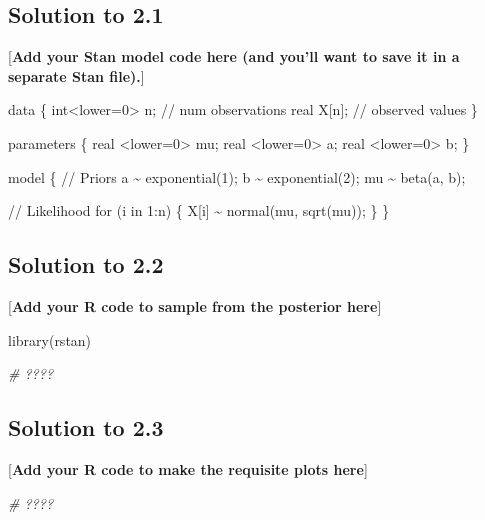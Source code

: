 \documentclass[
]{article}
\newenvironment{Shaded}{\begin{snugshade}}{\end{snugshade}}
\newcommand{\CommentTok}[1]{\textcolor[rgb]{0.56,0.35,0.01}{\textit{#1}}}
\newcommand{\FunctionTok}[1]{\textcolor[rgb]{0.00,0.00,0.00}{#1}}
\newcommand{\NormalTok}[1]{#1}
\begin{document}
\hypertarget{solution-to-2.1}{%
\subsection{Solution to 2.1}\label{solution-to-2.1}}

{[}\textbf{Add your Stan model code here (and you'll want to save it in
a separate Stan file).}{]}

\begin{Shaded}
\begin{Highlighting}[]
\NormalTok{data \{}
\NormalTok{  int\textless{}lower=0\textgreater{} n; // num observations}
\NormalTok{  real X[n];     // observed values}
\NormalTok{\}}

\NormalTok{parameters \{}
\NormalTok{  real \textless{}lower=0\textgreater{} mu;}
\NormalTok{  real \textless{}lower=0\textgreater{} a;}
\NormalTok{  real \textless{}lower=0\textgreater{} b;}
\NormalTok{\}}

\NormalTok{model \{}
\NormalTok{  // Priors}
\NormalTok{  a \textasciitilde{} exponential(1);}
\NormalTok{  b \textasciitilde{} exponential(2);}
\NormalTok{  mu \textasciitilde{} beta(a, b);}
  
\NormalTok{  // Likelihood}
\NormalTok{  for (i in 1:n) \{}
\NormalTok{    X[i] \textasciitilde{} normal(mu, sqrt(mu));}
\NormalTok{  \}}
\NormalTok{\}}
\end{Highlighting}
\end{Shaded}

\hypertarget{solution-to-2.2}{%
\subsection{Solution to 2.2}\label{solution-to-2.2}}

{[}\textbf{Add your R code to sample from the posterior here}{]}

\begin{Shaded}
\begin{Highlighting}[]
\FunctionTok{library}\NormalTok{(rstan)}

\CommentTok{\# ????}
\end{Highlighting}
\end{Shaded}

\hypertarget{solution-to-2.3}{%
\subsection{Solution to 2.3}\label{solution-to-2.3}}

{[}\textbf{Add your R code to make the requisite plots here}{]}

\begin{Shaded}
\begin{Highlighting}[]
\CommentTok{\# ????}
\end{Highlighting}
\end{Shaded}
\end{document}
